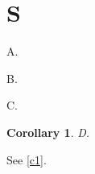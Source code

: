 \documentclass[a4paper,autoref,numberwithinsect]{lipics-v2021}
\newtheorem{recorollary}[corollary]{Corollary}
\begin{document}
\section{S}
\begin{theorem}A.\end{theorem}
\begin{corollary}\label{c1}B.\end{corollary}
\begin{theorem}C.\end{theorem}
\begin{recorollary}D.\end{recorollary}
See \autoref{c1}.
\end{document}
